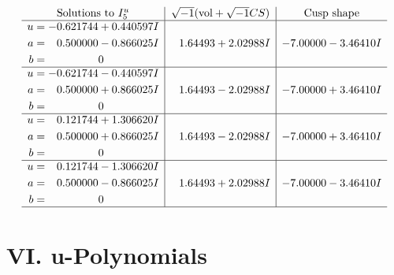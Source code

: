 \documentclass[1p]{elsarticle_modified}
\theoremstyle{definition}
\newcommand{\I}{\sqrt{-1}}
\begin{document}
$$\begin{array}{c|c|c}  
\text{Solutions to }I^u_{5}& \I (\text{vol} + \sqrt{-1}CS) & \text{Cusp shape}\\
 \hline 
\begin{aligned}
u &= -0.621744 + 0.440597 I \\
a &= \phantom{-}0.500000 - 0.866025 I \\
b &= \phantom{-0.000000 } 0\end{aligned}
 & \phantom{-}1.64493 + 2.02988 I & -7.00000 - 3.46410 I \\ \hline\begin{aligned}
u &= -0.621744 - 0.440597 I \\
a &= \phantom{-}0.500000 + 0.866025 I \\
b &= \phantom{-0.000000 } 0\end{aligned}
 & \phantom{-}1.64493 - 2.02988 I & -7.00000 + 3.46410 I \\ \hline\begin{aligned}
u &= \phantom{-}0.121744 + 1.306620 I \\
a &= \phantom{-}0.500000 + 0.866025 I \\
b &= \phantom{-0.000000 } 0\end{aligned}
 & \phantom{-}1.64493 - 2.02988 I & -7.00000 + 3.46410 I \\ \hline\begin{aligned}
u &= \phantom{-}0.121744 - 1.306620 I \\
a &= \phantom{-}0.500000 - 0.866025 I \\
b &= \phantom{-0.000000 } 0\end{aligned}
 & \phantom{-}1.64493 + 2.02988 I & -7.00000 - 3.46410 I\\
 \hline 
 \end{array}$$\newpage
\newpage\renewcommand{\arraystretch}{1}
\centering \section*{ VI. u-Polynomials}
\end{document}
